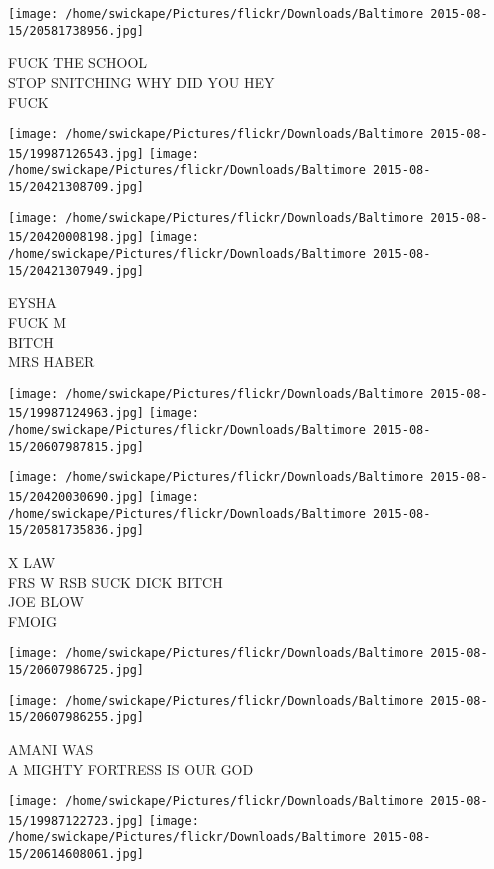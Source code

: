 \documentclass[10pt,letterpaper]{article}
\begin{document}
\vspace{0.25in}
\texttt{[image: /home/swickape/Pictures/flickr/Downloads/Baltimore 2015-08-15/20581738956.jpg]}

FUCK THE SCHOOL\\
STOP SNITCHING WHY DID YOU HEY\\
FUCK
\pagebreak

\texttt{[image: /home/swickape/Pictures/flickr/Downloads/Baltimore 2015-08-15/19987126543.jpg]}
\texttt{[image: /home/swickape/Pictures/flickr/Downloads/Baltimore 2015-08-15/20421308709.jpg]}

\texttt{[image: /home/swickape/Pictures/flickr/Downloads/Baltimore 2015-08-15/20420008198.jpg]}
\texttt{[image: /home/swickape/Pictures/flickr/Downloads/Baltimore 2015-08-15/20421307949.jpg]}

EYSHA\\
FUCK M\\
BITCH\\
MRS HABER
\pagebreak

\texttt{[image: /home/swickape/Pictures/flickr/Downloads/Baltimore 2015-08-15/19987124963.jpg]}
\texttt{[image: /home/swickape/Pictures/flickr/Downloads/Baltimore 2015-08-15/20607987815.jpg]}

\texttt{[image: /home/swickape/Pictures/flickr/Downloads/Baltimore 2015-08-15/20420030690.jpg]}
\texttt{[image: /home/swickape/Pictures/flickr/Downloads/Baltimore 2015-08-15/20581735836.jpg]}

X LAW\\
FRS W RSB SUCK DICK BITCH\\
JOE BLOW\\
FMOIG
\pagebreak

\texttt{[image: /home/swickape/Pictures/flickr/Downloads/Baltimore 2015-08-15/20607986725.jpg]}

\vspace{0.25in}
\texttt{[image: /home/swickape/Pictures/flickr/Downloads/Baltimore 2015-08-15/20607986255.jpg]}

AMANI WAS\\
A MIGHTY FORTRESS IS OUR GOD
\pagebreak

\texttt{[image: /home/swickape/Pictures/flickr/Downloads/Baltimore 2015-08-15/19987122723.jpg]}
\texttt{[image: /home/swickape/Pictures/flickr/Downloads/Baltimore 2015-08-15/20614608061.jpg]}
\end{document}
